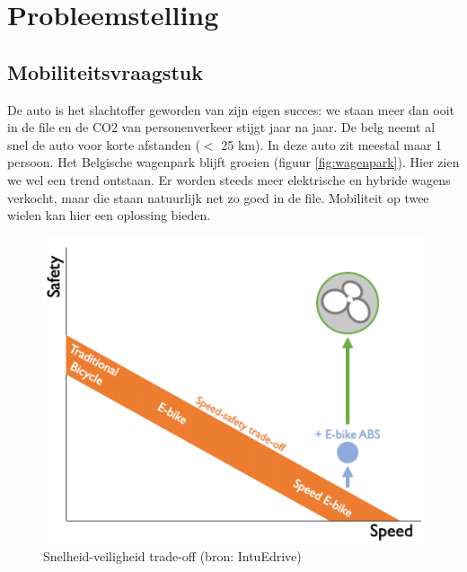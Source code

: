 \chapter{Probleemstelling}
\section{Mobiliteitsvraagstuk}
De auto is het slachtoffer geworden van zijn eigen succes: we staan meer dan ooit in de file en de CO2 van personenverkeer stijgt jaar na jaar. De belg neemt al snel de auto voor korte afstanden ($<$ 25 km). In deze auto zit meestal maar 1 persoon. Het Belgische wagenpark blijft groeien (figuur \ref{fig:wagenpark}). Hier zien we wel een trend ontstaan. Er worden steeds meer elektrische en hybride wagens verkocht, maar die staan natuurlijk net zo goed in de file. Mobiliteit op twee wielen kan hier een oplossing bieden.
\\

\begin{figure}
  \centering
  \includegraphics[width=1.1\linewidth]{images/snelheid-veiligheid-tradeoff.png}
  \caption{Snelheid-veiligheid trade-off (bron: IntuEdrive)}
  \label{fig:snelheid-veiligheid trade-off (bron: IntuEdrive)}
\end{figure}

